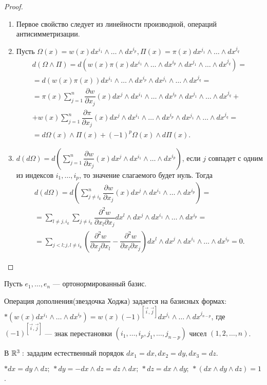\begin{proof} \ 
	\begin{enumerate}
		\item Первое свойство следует из линейности производной, операций  антисимметризации.
		\item Пусть $\Omega(x)=w(x)dx^{i_1}\wedge\ldots\wedge dx^{i_p}, \Pi(x)=\pi(x)dx^{j_1}\wedge\ldots\wedge dx^{j_q}$
		\begin{multline*}
			d(\Omega\wedge\Pi)=d(w(x)\pi(x)dx^{i_1}\wedge\ldots\wedge dx^{i_p}\wedge dx^{j_1}\wedge\ldots\wedge dx^{j_q})=\\=d(w(x)\pi(x))dx^{i_1}\wedge\ldots\wedge dx^{i_p}\wedge dx^{j_1}\wedge\ldots\wedge dx^{j_q}
			=\\=
			\pi(x)\sum\limits_{j=1}^n\dfrac{\partial w}{\partial x_j}(x)dx^j\wedge dx^{i_1}\wedge\ldots\wedge dx^{i_p}\wedge dx^{j_1}\wedge\ldots\wedge dx^{j_q}+\\+
			w(x)\sum\limits_{j=1}^n\dfrac{\partial \pi}{\partial x_j}(x)dx^j\wedge dx^{i_1}\wedge\ldots\wedge dx^{i_p}\wedge dx^{j_1}\wedge\ldots\wedge dx^{j_q}=\\=d\Omega(x)\wedge\Pi (x)+(-1)^p\Omega(x)\wedge d\Pi(x). 
		\end{multline*}
		\item $d(d\Omega)=d\left(\sum\limits_{j=1}^n\dfrac{\partial w}{\partial x_j}(x)dx^j\wedge dx^{i_1}\wedge\ldots\wedge dx^{i_p}\right)$, если $j$ совпадет с одним из индексов $i_1, \ldots, i_p$, то значение слагаемого будет нуль. Тогда
		\begin{multline*}
			d(d\Omega)=d\left(\sum\limits_{j\ne i_k}^n\dfrac{\partial w}{\partial x_j}(x)dx^j\wedge dx^{i_1}\wedge\ldots\wedge dx^{i_p}\right)=\\=\sum\limits_{l\ne j,i_k}\sum\limits_{j\ne i_k}\dfrac{\partial^2 w}{\partial x_l \partial x_j}dx^l\wedge dx^j\wedge dx^{i_1}\wedge\ldots\wedge  dx^{i_p}=\\=\sum\limits_{j<l; j,l\ne i_k} \left(\dfrac{\partial^2 w}{\partial x_j \partial x_l} - \dfrac{\partial^2 w}{\partial x_l \partial x_j}\right)dx^l\wedge dx^j\wedge dx^{i_1}\wedge\ldots\wedge  dx^{i_p}=0.
		\end{multline*}
	\end{enumerate}
\end{proof}

Пусть $e_1, \ldots, e_n$ --- ортонормированный базис.

\begin{Def}
	Операция дополнения(звездочка Ходжа) задается на базисных формах: $*(w(x)dx^{i_1}\wedge\ldots\wedge dx^{i_p})=w(x)(-1)^{[\vec{i},\vec{j}]}dx^{j_1}\wedge\ldots\wedge dx^{j_{n-p}}$, где $(-1)^{[\vec{i}, \vec{j}]}$ --- знак перестановки $(i_1, \ldots, i_p, j_1, \ldots, j_{n-p})$ чисел $(1,2,\ldots, n)$.
	
	В $\mathbb{R}^3:$ зададим естественный порядок $ dx_1=dx, dx_2=dy, dx_3=dz$.
	
	$*dx = dy\wedge dz;\ *dy=-dx\wedge dz=dz\wedge dx;\ *dz=dx\wedge dy;\ *(dx\wedge dy\wedge dz)=1$.
\end{Def}

